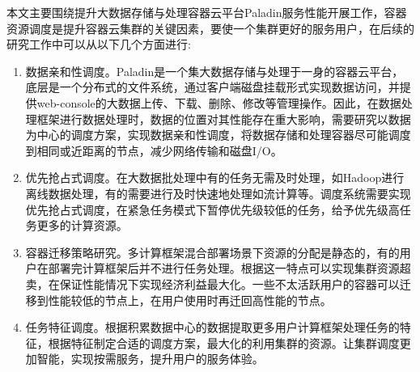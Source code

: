 本文主要围绕提升大数据存储与处理容器云平台Paladin服务性能开展工作，容器资源调度是提升容器云集群的关键因素，要使一个集群更好的服务用户，在后续的研究工作中可以从以下几个方面进行:
\begin{enumerate}[1.]
	\item 数据亲和性调度。Paladin是一个集大数据存储与处理于一身的容器云平台，底层是一个分布式的文件系统，通过客户端磁盘挂载形式实现数据访问，并提供web-console的大数据上传、下载、删除、修改等管理操作。因此，在数据处理框架进行数据处理时，数据的位置对其性能存在重大影响，需要研究以数据为中心的调度方案，实现数据亲和性调度，将数据存储和处理容器尽可能调度到相同或近距离的节点，减少网络传输和磁盘I/O。
	\item 优先抢占式调度。在大数据批处理中有的任务无需及时处理，如Hadoop进行离线数据处理，有的需要进行及时快速地处理如流计算等。调度系统需要实现优先抢占式调度，在紧急任务模式下暂停优先级较低的任务，给予优先级高任务更多的计算资源。
	\item 容器迁移策略研究。多计算框架混合部署场景下资源的分配是静态的，有的用户在部署完计算框架后并不进行任务处理。根据这一特点可以实现集群资源超卖，在保证性能情况下实现经济利益最大化。一些不太活跃用户的容器可以迁移到性能较低的节点上，在用户使用时再迁回高性能的节点。
	\item 任务特征调度。根据积累数据中心的数据提取更多用户计算框架处理任务的特征，根据特征制定合适的调度方案，最大化的利用集群的资源。让集群调度更加智能，实现按需服务，提升用户的服务体验。
\end{enumerate}